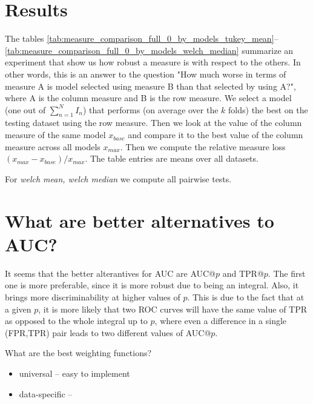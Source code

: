 \documentclass[a4paper]{article}
\begin{document}
\section{Results}
The tables \ref{tab:measure_comparison_full_0_by_models_tukey_mean}--\ref{tab:measure_comparison_full_0_by_models_welch_median} summarize an experiment that show us how robust a measure is with respect to the others. In other words, this is an answer to the question "How much worse in terms of measure A is model selected using measure B than that selected by using A?", where A is the column measure and B is the row measure. We select a model (one out of $\sum_{n=1}^N I_n$) that performs (on average over the $k$ folds) the best on the testing dataset using the row measure. Then we look at the value of the column measure of the same model $x_{base}$ and compare it to the best value of the column measure across all models $x_{max}$. Then we compute the relative measure loss $(x_{max}-x_{base})/x_{max}$.  The table entries are means over all datasets.

For \emph{welch mean, welch median} we compute all pairwise tests.







\section{What are better alternatives to AUC?}
It seems that the better alterantives for AUC are AUC@$p$ and TPR@$p$. The first one is more preferable, since it is more robust due to being an integral. Also, it brings more discriminability at higher values of $p$. This is due to the fact that at a given $p$, it is more likely that two ROC curves will have the same value of TPR as opposed to the whole integral up to $p$, where even a difference in a single (FPR,TPR) pair leads to two different values of AUC@$p$.

What are the best weighting functions?
\begin{itemize}
	\item universal -- easy to implement
	\item data-specific -- 
\end{itemize}
\end{document}
